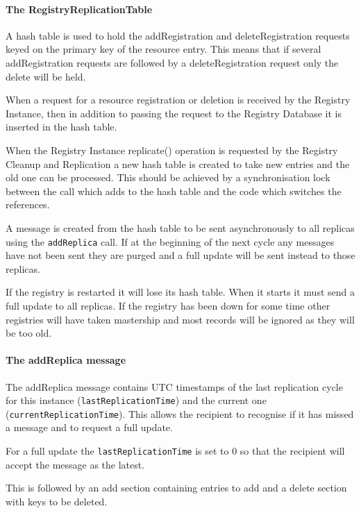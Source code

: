\paragraph{The RegistryReplicationTable}

A hash table is used to hold the addRegistration and
deleteRegistration requests keyed on the primary key of the resource
entry. This means that if several addRegistration requests are
followed by a deleteRegistration request only the delete will be held.

When a request for a resource registration or deletion is received by
the Registry Instance, then in addition to passing the request to the
Registry Database it is inserted in the hash table.

When the Registry Instance replicate() operation is requested by the
Registry Cleanup and Replication a new hash table is created to take
new entries and the old one can be processed. This should be achieved
by a synchronisation lock between the call which adds to the hash
table and the code which switches the references.

A message is created from the hash table to be sent asynchronously to
all replicas using the \texttt{addReplica} call. If at the beginning
of the next cycle any messages have not been sent they are purged and
a full update will be sent instead to those replicas.

If the registry is restarted it will lose its hash table. When it
starts it must send a full update to all replicas. If the registry has
been down for some time other registries will have taken mastership
and most records will be ignored as they will be too old.

\paragraph{The addReplica message}

The addReplica message contains UTC timestamps of the last replication
cycle for this instance (\texttt{lastReplicationTime}) and the current
one (\texttt{currentReplicationTime}). This allows the recipient to
recognise if it has missed a message and to request a full update.

For a full update the \texttt{lastReplicationTime} is set to 0 so that the 
recipient will accept the message as the latest.

This is followed by an add section containing entries to add and a
delete section with keys to be deleted.

